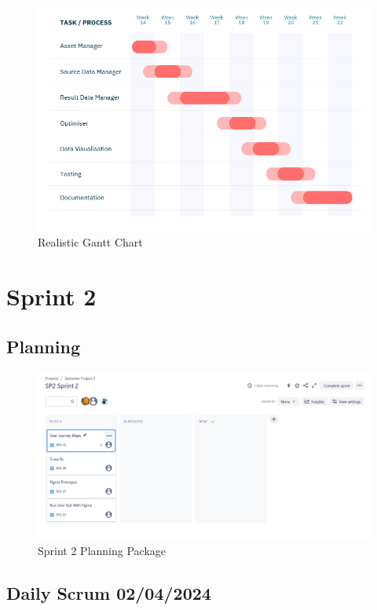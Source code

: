 \documentclass[12pt]{report}
\begin{document}
\begin{figure}[H]
  \centering
  \includegraphics[width=1\textwidth]{Resources/1-Sprint/Gantt-Chart-Realistic.png}
  \caption{Realistic Gantt Chart}
  \label{fig:RealGanttChart-image}
\end{figure}




\section{Sprint 2}
\subsection{Planning}
\begin{figure}[H]
  \centering
  \includegraphics[width=1\textwidth]{Resources/2-Sprint/Planning/Sprint2_Planning_Package.png}
  \caption{Sprint 2 Planning Package}
  \label{fig:S2Planning-image}
\end{figure}

\subsection*{Daily Scrum 02/04/2024}
\end{document}
